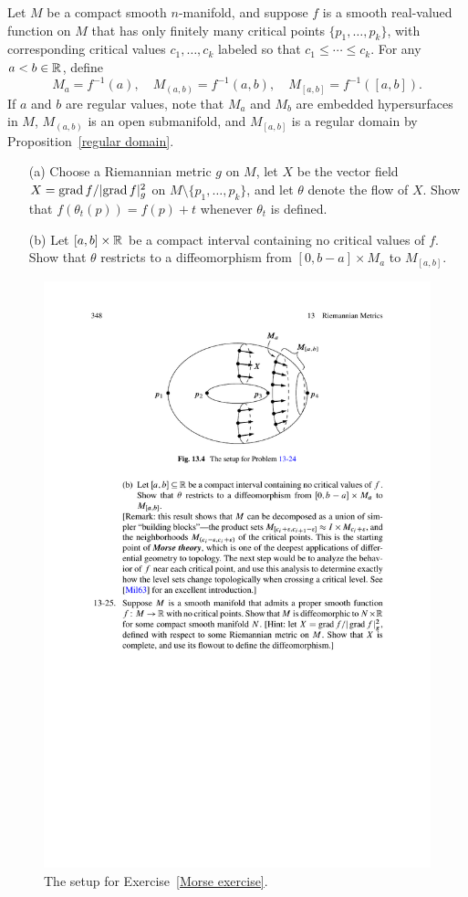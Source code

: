 \begin{exercise}\label{Morse exercise}
Let $M$ be a compact smooth $n$-manifold, and suppose $f$ is a smooth real-valued function on $M$ that has only finitely many critical points $\{p_1,\dots,p_k\}$, with 
corresponding critical values $c_1,\dots,c_k$ labeled so that $c_1\leq \cdots\leq c_k$. For any $a<b\in\mathbb{R}$, define
\[M_a=f^{-1}(a),\quad M_{(a,b)}=f^{-1}(a,b),\quad M_{[a,b]}=f^{-1}([a,b]).\]
If $a$ and $b$ are regular values, note that $M_a$ and $M_b$ are embedded hypersurfaces in $M$, $M_{(a,b)}$ is an open submanifold, and $M_{[a,b]}$ is a regular domain by Proposition~\ref{regular domain}.
\begin{itemize}
\item[(a)] Choose a Riemannian metric $g$ on $M$, let $X$ be the vector field $X=\mathrm{grad}\, f/|\mathrm{grad}\, f|_g^2$ on $M\setminus\{p_1,\dots,p_k\}$, and let $\theta$ denote the 
flow of $X$. Show that $f(\theta_t(p))=f(p)+t$ whenever $\theta_t$ is defined.
\item[(b)] Let $[a,b]\times\mathbb{R}$ be a compact interval containing no critical values of $f$. Show that $\theta$ restricts to a diffeomorphism from $[0,b-a]\times M_a$ to 
$M_{[a,b]}$.
\end{itemize}
\end{exercise}
\begin{figure}[htbp]
\centering
\includegraphics{pictures/Morse-setup}
\caption{The setup for Exercise~\ref{Morse exercise}.}
\end{figure}
